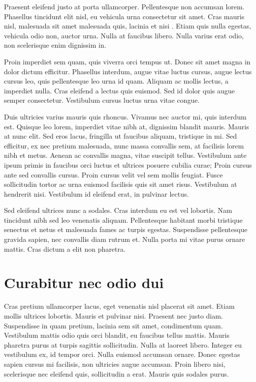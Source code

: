 \documentclass[conference]{IEEEtran}
\begin{document}
Praesent eleifend justo at porta ullamcorper. Pellentesque non accumsan lorem. Phasellus tincidunt
elit nisl, eu vehicula urna consectetur sit amet. Cras mauris nisl, malesuada sit amet malesuada
quis, lacinia et nisi \cite{SW1977}. Etiam quis nulla egestas, vehicula odio non, auctor urna. Nulla at faucibus
libero. Nulla varius erat odio, non scelerisque enim dignissim in.

Proin imperdiet sem quam, quis viverra orci tempus ut. Donec sit amet magna in dolor dictum
efficitur. Phasellus interdum, augue vitae luctus cursus, augue lectus cursus leo, quis pellentesque
leo urna id quam. Aliquam ac mollis lectus, a imperdiet nulla. Cras eleifend a lectus quis euismod.
Sed id dolor quis augue semper consectetur. Vestibulum cursus luctus urna vitae congue. 

Duis ultricies varius mauris quis rhoncus. Vivamus nec auctor mi, quis interdum est. Quisque leo
lorem, imperdiet vitae nibh at, dignissim blandit mauris. Mauris at nunc elit. Sed eros lacus,
fringilla ut faucibus aliquam, tristique in mi. Sed efficitur, ex nec pretium malesuada, nunc massa
convallis sem, at facilisis lorem nibh et metus. Aenean ac convallis magna, vitae suscipit tellus.
Vestibulum ante ipsum primis in faucibus orci luctus et ultrices posuere cubilia curae; Proin cursus
ante sed convallis cursus. Proin cursus velit vel sem mollis feugiat. Fusce sollicitudin tortor ac
urna euismod facilisis quis sit amet risus. Vestibulum at hendrerit nisi. Vestibulum id eleifend
erat, in pulvinar lectus.

Sed eleifend ultrices nunc a sodales. Cras interdum eu est vel lobortis. Nam tincidunt nibh sed leo
venenatis aliquam. Pellentesque habitant morbi tristique senectus et netus et malesuada fames ac
turpis egestas. Suspendisse pellentesque gravida sapien, nec convallis diam rutrum et. Nulla porta
mi vitae purus ornare mattis. Cras dictum a elit non pharetra.

\section{Curabitur nec odio dui}

Cras pretium ullamcorper lacus, eget venenatis nisl placerat sit amet. Etiam mollis ultrices
lobortis. Mauris et pulvinar nisi. Praesent nec justo diam. Suspendisse in quam pretium, lacinia sem
sit amet, condimentum quam. Vestibulum mattis odio quis orci blandit, eu faucibus tellus mattis.
Mauris pharetra purus at turpis sagittis sollicitudin. Nulla at laoreet libero. Integer eu
vestibulum ex, id tempor orci. Nulla euismod accumsan ornare. Donec egestas sapien cursus mi
facilisis, non ultricies augue accumsan. Proin libero nisi, scelerisque nec eleifend quis,
sollicitudin a erat. Mauris quis sodales purus.
\end{document}
